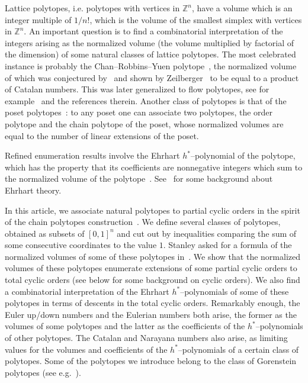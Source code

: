 \documentclass[11pt]{article}
\theoremstyle{definition}
\numberwithin{equation}{section}
\numberwithin{figure}{section}
\numberwithin{table}{section}
\newcommand{\Z}{\mathbb Z}
\newcommand*{\MK}{\mkern 2mu}
\begin{document}
Lattice polytopes, i.e. polytopes with vertices in $\Z^n$, have a volume which is an integer multiple of $1/n!$, which is the volume of the smallest simplex with vertices in $\Z^n$. An important question is to find a combinatorial interpretation of the integers arising as the normalized volume (the volume multiplied by factorial of the dimension) of some natural classes of lattice polytopes. The most celebrated instance is probably the Chan--Robbins--Yuen polytope~\cite{CRY00}, the normalized volume of which was conjectured by~\cite{CRY00} and shown by Zeilberger~\cite{Z99} to be equal to a product of Catalan numbers. This was later generalized to flow polytopes, see for example~\cite{CKM17} and the references therein. Another class of polytopes is that of the poset polytopes~\cite{S86}: to any poset one can associate two polytopes, the order polytope and the chain polytope of the poset, whose normalized volumes are equal to the number of linear extensions of the poset.

Refined enumeration results involve the Ehrhart $h^*$--polynomial of the polytope, which has the property that its coefficients are nonnegative integers which sum to the normalized volume of the polytope~\cite{S80}. See~\cite{BR15} for some background about Ehrhart theory.

In this article, we associate natural polytopes to partial cyclic orders in the spirit of the chain polytopes construction~\cite{S86}. We define several classes of polytopes, obtained as subsets of $[0,1]^n$ and cut out by inequalities comparing the sum of some consecutive coordinates to the value $1$. Stanley asked for a formula of the normalized volumes of some of these polytopes in~\cite[Exercise~4.56$\MK$(d)]{S12}. We show that the normalized volumes of these polytopes enumerate extensions of some partial cyclic orders to total cyclic orders (see below for some background on cyclic orders). We also find a combinatorial interpretation of the Ehrhart $h^*$--polynomials of some of these polytopes in terms of descents in the total cyclic orders. Remarkably enough, the Euler up/down numbers and the Eulerian numbers both arise, the former as the volumes of some polytopes and the latter as the coefficients of the $h^*$--polynomials of other polytopes. The Catalan and Narayana numbers also arise, as limiting values for the volumes and coefficients of the $h^*$--polynomials of a certain class of polytopes. Some of the polytopes we introduce belong to the class of Gorenstein polytopes (see e.g.~\cite{BN08}).
\end{document}

